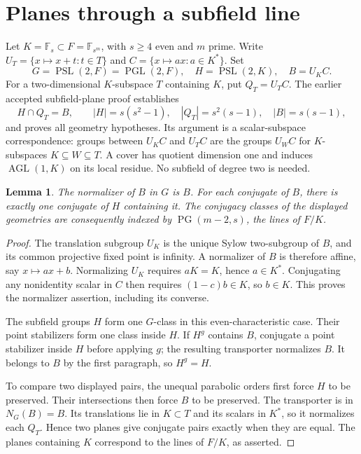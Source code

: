 \documentclass[11pt]{article}
\newtheorem{lemma}[theorem]{Lemma}
\newcommand{\F}{\mathbb F}
\newcommand{\PSL}{\operatorname{PSL}}
\newcommand{\PGL}{\operatorname{PGL}}
\newcommand{\PG}{\operatorname{PG}}
\begin{document}
\section{Planes through a subfield line}
Let $K=\F_s\subset F=\F_{s^m}$, with $s\ge4$ even and $m$ prime.
Write $U_T=\{x\mapsto x+t:t\in T\}$ and
$C=\{x\mapsto ax:a\in K^*\}$. Set
\[
 G=\PSL(2,F)=\PGL(2,F),\quad H=\PSL(2,K),\quad B=U_K C.
\]
For a two-dimensional $K$-subspace $T$ containing $K$, put $Q_T=U_TC$.
The earlier accepted subfield-plane proof establishes
\[
 H\cap Q_T=B,\qquad |H|=s(s^2-1),\quad |Q_T|=s^2(s-1),
 \quad |B|=s(s-1),
\]
and proves all geometry hypotheses. Its argument is a scalar-subspace
correspondence: groups between $U_KC$ and $U_TC$ are the groups $U_WC$
for $K$-subspaces $K\subseteq W\subseteq T$. A cover has quotient
dimension one and induces $\operatorname{AGL}(1,K)$ on its local residue.
No subfield of degree two is needed.

\begin{lemma}\label{normalizer}
The normalizer of $B$ in $G$ is $B$. For each conjugate of $B$, there
is exactly one conjugate of $H$ containing it. The conjugacy classes of
the displayed geometries are consequently indexed by
$\PG(m-2,s)$, the lines of $F/K$.
\end{lemma}
\begin{proof}
The translation subgroup $U_K$ is the unique Sylow two-subgroup of $B$,
and its common projective fixed point is infinity. A normalizer of $B$
is therefore affine, say $x\mapsto ax+b$. Normalizing $U_K$ requires
$aK=K$, hence $a\in K^*$. Conjugating any nonidentity scalar in $C$
then requires $(1-c)b\in K$, so $b\in K$. This proves the normalizer
assertion, including its converse.

The subfield groups $H$ form one $G$-class in this even-characteristic
case. Their point stabilizers form one class inside $H$. If $H^g$
contains $B$, conjugate a point stabilizer inside $H$ before applying
$g$; the resulting transporter normalizes $B$. It belongs to $B$ by
the first paragraph, so $H^g=H$.

To compare two displayed pairs, the unequal parabolic orders first force
$H$ to be preserved. Their intersections then force $B$ to be preserved.
The transporter is in $N_G(B)=B$. Its translations lie in $K\subset T$
and its scalars in $K^*$, so it normalizes each $Q_T$. Hence two planes
give conjugate pairs exactly when they are equal. The planes containing
$K$ correspond to the lines of $F/K$, as asserted.
\end{proof}
\end{document}
